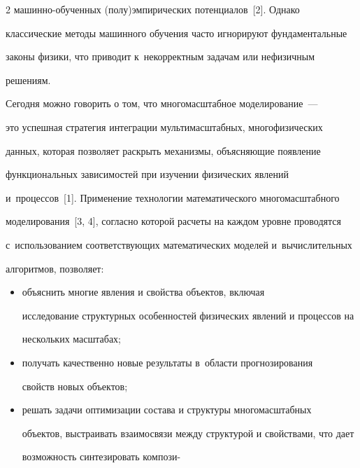 \begin{multicols}{2}
ма\-шин\-но-обучен\-ных (полу)эмпирических потенциалов~[2]. Однако 


классические методы машинного обучения час\-то игнорируют фундаментальные 


законы физики, что приводит к~некорректным задачам или нефизичным 


решениям.


    


Сегодня можно говорить о том, что многомасштабное моделирование~--- 


    это успешная стратегия интеграции мультимасштабных, многофизических 


данных, которая позволяет раскрыть механизмы, объясняющие появление 


функциональных зависимостей при изучении физических явлений 


и~процессов~[1]. Применение технологии математического многомасштабного 


моделирования~[3, 4], согласно которой расчеты на каждом уровне проводятся 


с~использованием соответствующих математических моделей и~вычислительных 


алгоритмов, позволяет:\\[-15pt]


    \begin{itemize}


     \item объяснить многие явления и свойства объектов, включая 


исследование структурных особенностей физических явлений и процессов на 


нескольких масштабах;\\[-15pt]


     \item получать качественно новые результаты в~об\-ласти прогнозирования 


свойств новых объектов;\\[-15pt]


     \item решать задачи оптимизации состава и структуры многомасштабных 


объектов, выстраивать взаимосвязи между структурой и свойствами, что дает 


возможность синтезировать компози-\linebreak\vspace*{-12pt}


\end{itemize}






\end{multicols}
